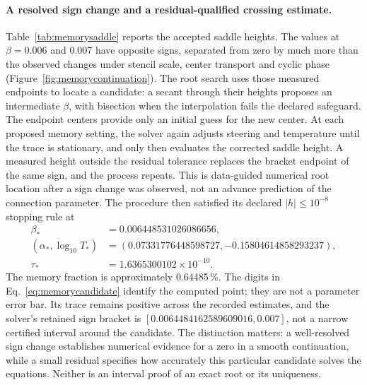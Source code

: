 \documentclass[11pt,letterpaper]{article}
\begin{document}
\paragraph{A resolved sign change and a residual-qualified crossing estimate.} Table~\ref{tab:memorysaddle}
reports the accepted saddle heights. The values at $\beta=0.006$ and 0.007 have opposite signs, separated from zero
by much more than the observed changes under stencil scale, center transport and cyclic phase
(Figure~\ref{fig:memorycontinuation}). The root search
uses those measured endpoints to locate a candidate: a secant through their heights proposes an intermediate
$\beta$, with bisection when the interpolation fails the declared safeguard. The endpoint centers provide only
an initial guess for the new center. At each proposed memory setting, the solver again adjusts steering and
temperature until the trace is stationary, and only then evaluates the corrected saddle height. A measured
height outside the residual tolerance replaces the bracket endpoint of the same sign, and the process repeats.
This is data-guided numerical root location after a sign change was observed, not an advance prediction of the
connection parameter. The procedure then satisfied its declared $|h|\le10^{-8}$ stopping rule at
\begin{equation}
 \begin{split}
 \beta_*&=0.006448531026086656,\\
 (\alpha_*,\log_{10}T_*)&=(0.07331776448598727,-0.15804614858293237),\\
 \tau_*&=1.6365300102\times10^{-10}.
 \end{split}
 \label{eq:memorycandidate}
\end{equation}
The memory fraction is approximately 0.64485\,\%. The digits in Eq.~\eqref{eq:memorycandidate} identify the
computed point; they are not a parameter error bar. Its trace remains positive across the recorded estimates, and
the solver's retained sign bracket is $[0.0064484162589609016,0.007]$, not a narrow certified interval around the
candidate. The distinction matters: a well-resolved sign change establishes numerical evidence for a zero in a
smooth continuation, while a small residual specifies how accurately this particular candidate solves the
equations. Neither is an interval proof of an exact root or its uniqueness.
\end{document}
